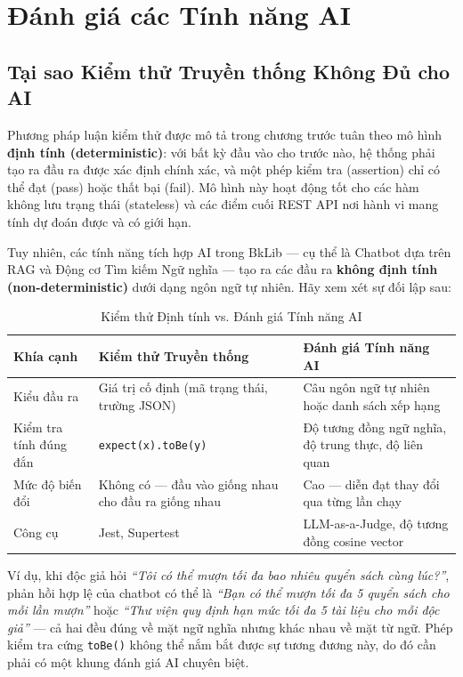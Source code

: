 \section{Đánh giá các Tính năng AI}

\subsection{Tại sao Kiểm thử Truyền thống Không Đủ cho AI}

Phương pháp luận kiểm thử được mô tả trong chương trước tuân theo mô hình \textbf{định tính (deterministic)}: với bất kỳ đầu vào cho trước nào, hệ thống phải tạo ra đầu ra được xác định chính xác, và một phép kiểm tra (assertion) chỉ có thể đạt (pass) hoặc thất bại (fail). Mô hình này hoạt động tốt cho các hàm không lưu trạng thái (stateless) và các điểm cuối REST API nơi hành vi mang tính dự đoán được và có giới hạn.

Tuy nhiên, các tính năng tích hợp AI trong BkLib — cụ thể là Chatbot dựa trên RAG và Động cơ Tìm kiếm Ngữ nghĩa — tạo ra các đầu ra \textbf{không định tính (non-deterministic)} dưới dạng ngôn ngữ tự nhiên. Hãy xem xét sự đối lập sau:

\begin{table}[H]
\centering
\caption{Kiểm thử Định tính vs. Đánh giá Tính năng AI}
\begin{tabularx}{\textwidth}{|p{3.5cm}|X|X|}
\hline
\textbf{Khía cạnh} & \textbf{Kiểm thử Truyền thống} & \textbf{Đánh giá Tính năng AI} \\
\hline
Kiểu đầu ra & Giá trị cố định (mã trạng thái, trường JSON) & Câu ngôn ngữ tự nhiên hoặc danh sách xếp hạng \\
\hline
Kiểm tra tính đúng đắn & \texttt{expect(x).toBe(y)} & Độ tương đồng ngữ nghĩa, độ trung thực, độ liên quan \\
\hline
Mức độ biến đổi & Không có — đầu vào giống nhau cho đầu ra giống nhau & Cao — diễn đạt thay đổi qua từng lần chạy \\
\hline
Công cụ & Jest, Supertest & LLM-as-a-Judge, độ tương đồng cosine vector \\
\hline
\end{tabularx}
\end{table}

\noindent Ví dụ, khi độc giả hỏi \textit{``Tôi có thể mượn tối đa bao nhiêu quyển sách cùng lúc?''}, phản hồi hợp lệ của chatbot có thể là \textit{``Bạn có thể mượn tối đa 5 quyển sách cho mỗi lần mượn''} hoặc \textit{``Thư viện quy định hạn mức tối đa 5 tài liệu cho mỗi độc giả''} — cả hai đều đúng về mặt ngữ nghĩa nhưng khác nhau về mặt từ ngữ. Phép kiểm tra cứng \texttt{toBe()} không thể nắm bắt được sự tương đương này, do đó cần phải có một khung đánh giá AI chuyên biệt.

